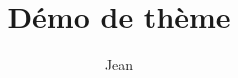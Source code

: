 \documentclass{beamer}
\title{Démo de thème}
\author{Jean}
\begin{document}
\begin{frame}
\titlepage
\end{frame}
\end{document}
